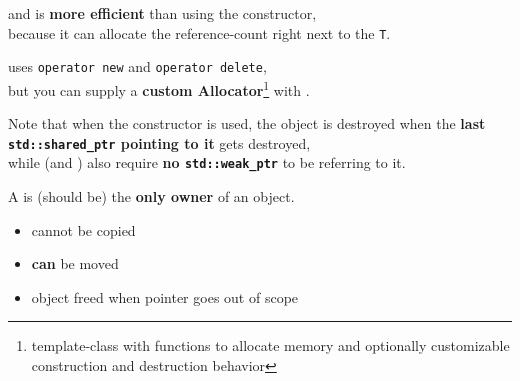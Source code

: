 	\begin{frame}{ and }
		 is \textbf{more efficient} than using the  constructor, \\
		because it can allocate the reference-count right next to the \lstinline|T|.
		
		\pause
		
		 uses \lstinline|operator new| and \lstinline|operator delete|, \\
		but you can supply a \textbf{custom Allocator}\footnote{template-class with functions to allocate memory and optionally customizable construction and destruction behavior} with .
		
		\pause
		
		\emptyline
		
		Note that when the  constructor is used, the object is destroyed when the \textbf{last \lstinline[basicstyle=\bf\ttfamily]|std::shared_ptr| pointing to it} gets destroyed, \\
	while  (and ) also require \textbf{no \lstinline[basicstyle=\bf\ttfamily]|std::weak_ptr|} to be referring to it.
	\end{frame}
	
	\begin{frame}{}
		A  is (should be) the \textbf{only owner} of an object.
		
		\begin{itemize}
			\item cannot be copied
			\item \textbf{can} be moved
			\item object freed when pointer goes out of scope
		\end{itemize}
		
	\end{frame}
	
